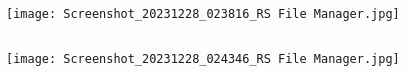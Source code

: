 \begin{column}{0.5\textwidth}
    \begin{figure}[htp]
        \texttt{[image: Screenshot\_20231228\_023816\_RS File Manager.jpg]}
    \end{figure}
\end{column}

\begin{column}{0.5\textwidth}
    \begin{figure}[htp]
        \texttt{[image: Screenshot\_20231228\_024346\_RS File Manager.jpg]}
    \end{figure}
\end{column}

